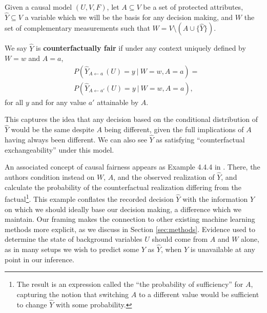 Given a causal model $(U, V, F)$, let $A\subseteq V$ be a set of protected
attributes, $\hat Y \subseteq V$ a variable which we will be the basis for
any decision making, and $W$ the set of complementary measurements such that
$W= V \setminus ( A \cup \{\hat Y\})$.
\begin{define}
We say $\hat Y$ is {\bf counterfactually fair}
if under any context uniquely defined by $W = w$ and $A = a$,
  \label{eq:cf_definition}
\begin{align}
  &P(\hat Y_{A \leftarrow a\ }(U) = y\ |\ W = w, A = a)  =\nonumber\\ 
  &P(\hat Y_{A \leftarrow a'}(U) = y\ |\ W = w, A = a), 
\end{align}
for all $y$ and for any value $a'$ attainable by $A$.
\end{define}
This captures the idea that any decision based on the
conditional distribution of $\hat Y$ would be the same despite  $A$ being
different, given the full implications of $A$ having always been different.
We can also see $\hat Y$ as satisfying ``counterfactual exchangeability''
under this model.

An associated concept of causal fairness appears as Example 4.4.4 in
\citet{pearl:16}. There, the authors condition instead on $W$, $A$,
and the observed realization of $\hat Y$, and calculate the
probability of the counterfactual realization differing from the
factual\footnote{The result is an expression called the ``the
  probability of sufficiency'' for $A$, capturing the notion that
  switching $A$ to a different value would be sufficient to change
  $\hat Y$ with some probability.}. This example conflates the
recorded decision $\hat Y$ with the information $Y$ on which we should
ideally base our decision making, a difference which we maintain.  Our
framing makes the connection to other existing machine learning
methods more explicit, as we discuss in Section \ref{sec:methods}.
Evidence used to determine the state of background variables $U$
should come from $A$ and $W$ alone, as in many setups we wish to
predict some $Y$ as $\hat Y$, when $Y$ is unavailable at any point in
our inference.

